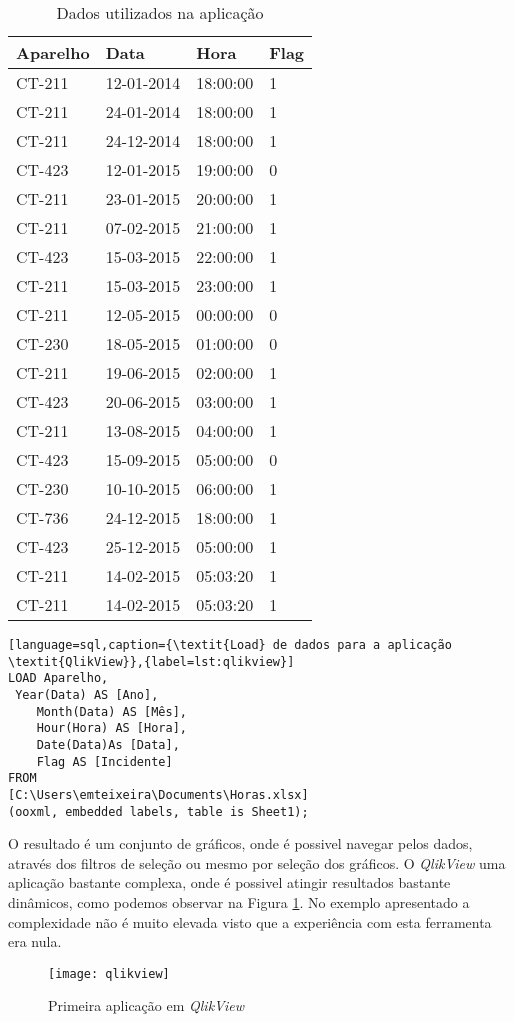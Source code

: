 \begin{table}[]
\centering
\begin{tabular}{llll}
Aparelho & Data & Hora & Flag \\
\hline
CT-211 & 12-01-2014 & 18:00:00 & 1 \\
CT-211 & 24-01-2014 & 18:00:00 & 1 \\
CT-211 & 24-12-2014 & 18:00:00 & 1 \\
CT-423 & 12-01-2015 & 19:00:00 & 0 \\
CT-211 & 23-01-2015 & 20:00:00 & 1 \\
CT-211 & 07-02-2015 & 21:00:00 & 1 \\
CT-423 & 15-03-2015 & 22:00:00 & 1 \\
CT-211 & 15-03-2015 & 23:00:00 & 1 \\
CT-211 & 12-05-2015 & 00:00:00 & 0 \\
CT-230 & 18-05-2015 & 01:00:00 & 0 \\
CT-211 & 19-06-2015 & 02:00:00 & 1 \\
CT-423 & 20-06-2015 & 03:00:00 & 1 \\
CT-211 & 13-08-2015 & 04:00:00 & 1 \\
CT-423 & 15-09-2015 & 05:00:00 & 0 \\
CT-230 & 10-10-2015 & 06:00:00 & 1 \\
CT-736 & 24-12-2015 & 18:00:00 & 1 \\
CT-423 & 25-12-2015 & 05:00:00 & 1 \\
CT-211 & 14-02-2015 & 05:03:20 & 1 \\
CT-211 & 14-02-2015 & 05:03:20 & 1
\end{tabular}
\caption{Dados utilizados na aplicação}
\label{tbl:dadosQlik}
\end{table}

\begin{lstlisting}[language=sql,caption={\textit{Load} de dados para a aplicação \textit{QlikView}},{label=lst:qlikview}]
LOAD Aparelho,
 Year(Data) AS [Ano],
    Month(Data) AS [Mês],
    Hour(Hora) AS [Hora],
    Date(Data)As [Data],
    Flag AS [Incidente]
FROM
[C:\Users\emteixeira\Documents\Horas.xlsx]
(ooxml, embedded labels, table is Sheet1);
\end{lstlisting}

\par O resultado é um conjunto de gráficos, onde é possivel navegar pelos dados, através dos filtros de seleção ou mesmo por seleção dos gráficos. O \textit{QlikView} uma aplicação bastante complexa, onde é possivel atingir resultados bastante dinâmicos, como podemos observar na Figura \ref{fig:qlikViewFig}. No exemplo apresentado a complexidade não é muito elevada visto que a experiência com esta ferramenta era nula.
\begin{figure}[!htb]
\centering
\texttt{[image: qlikview]}
\caption{Primeira aplicação em \textit{QlikView}}
\label{fig:qlikViewFig}
\end{figure}
